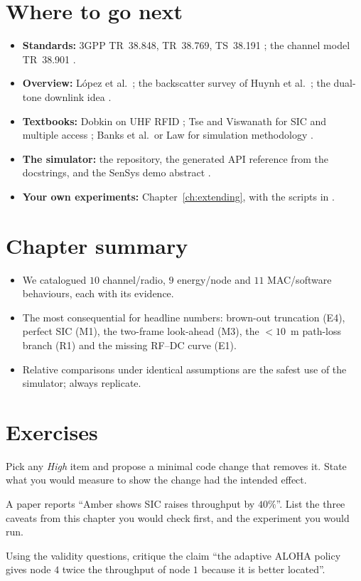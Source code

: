 \section{Where to go next}

\begin{itemize}
 \item \textbf{Standards:} 3GPP TR~38.848, TR~38.769, TS~38.191 \citep{3gpp38848,3gpp38769,3gpp38191}; the channel model TR~38.901 \citep{3gpp38901}.
 \item \textbf{Overview:} L\'opez et al.\ \citep{lopez2025zero}; the backscatter survey of Huynh et al.\ \citep{huynh2018ambient}; the dual-tone downlink idea \citep{zhu2022ofdma}.
 \item \textbf{Textbooks:} Dobkin on UHF RFID \citep{dobkin2012}; Tse and Viswanath for SIC and multiple access \citep{tse2005}; Banks et al.\ or Law for simulation methodology \citep{banks2010,law2015}.
 \item \textbf{The simulator:} the repository, the generated API reference from the docstrings, and the SenSys demo abstract \citep{manafova2026amber}.
 \item \textbf{Your own experiments:} Chapter~\ref{ch:extending}, with the scripts in .
\end{itemize}

\section{Chapter summary}
\begin{itemize}
 \item We catalogued $10$ channel/radio, $9$ energy/node and $11$ MAC/software behaviours, each with its evidence.
 \item The most consequential for headline numbers: brown-out truncation (E4), perfect SIC (M1), the two-frame look-ahead (M3), the $<10$~m path-loss branch (R1) and the missing RF--DC curve (E1).
 \item Relative comparisons under identical assumptions are the safest use of the simulator; always replicate.
\end{itemize}

\section*{Exercises}
\begin{exercise}
Pick any \emph{High} item and propose a minimal code change that removes it. State what you would measure to show the change had the intended effect.
\end{exercise}
\begin{exercise}
A paper reports ``Amber shows SIC raises throughput by $40\%$''. List the three caveats from this chapter you would check first, and the experiment you would run.
\end{exercise}
\begin{exercise}
Using the validity questions, critique the claim ``the adaptive ALOHA policy gives node $4$ twice the throughput of node $1$ because it is better located''.
\end{exercise}
